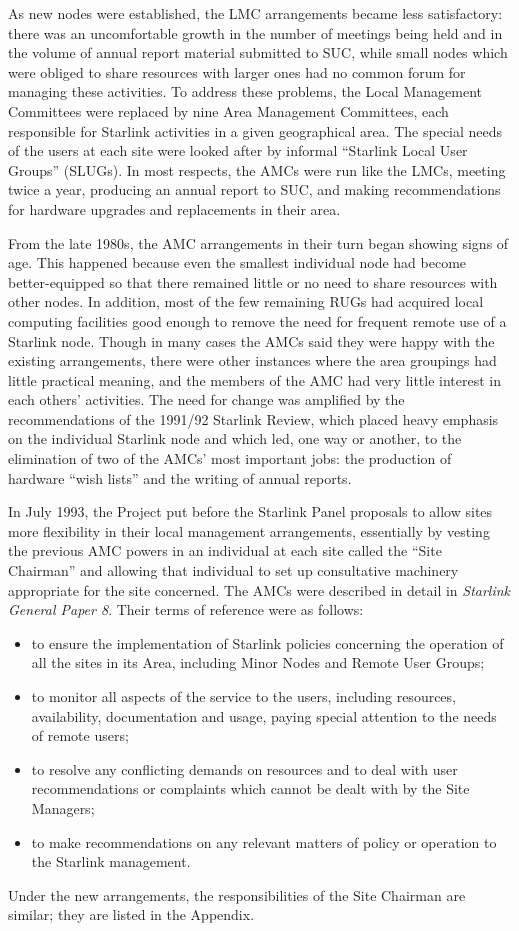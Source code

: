 As new nodes were established, the LMC arrangements became less
satisfactory:  there was an uncomfortable growth in the number of meetings
being held and in the volume of annual report material submitted to SUC,
while small nodes which were obliged to share resources with larger ones
had no common forum for managing these activities.  To address these
problems, the Local Management Committees were replaced by nine Area
Management Committees, each responsible for Starlink activities in a
given geographical area.  The special needs of the users at each site
were looked after by informal ``Starlink Local User Groups'' (SLUGs).  In
most respects, the AMCs were run like the LMCs, meeting twice a year,
producing an annual report to SUC, and making recommendations for
hardware upgrades and replacements in their area.

From the late 1980s, the AMC arrangements in their turn began showing signs
of age.  This happened because even the smallest individual node had
become better-equipped so that there remained little or no need to share
resources with other nodes.  In addition, most of the few remaining RUGs
had acquired local computing facilities good enough to remove the need for
frequent remote use of a
Starlink node.  Though in many cases the AMCs said they were
happy with the existing arrangements, there were other instances where the
area groupings had little practical meaning, and the members of the AMC
had very little interest in each others' activities.
The need for change was amplified by
the recommendations of the 1991/92 Starlink Review, which placed heavy emphasis
on the individual Starlink node and which led, one way or another, to the
elimination of two of the AMCs' most important jobs:  the production of
hardware ``wish lists'' and the writing of annual reports.

In July 1993, the Project put before the Starlink Panel proposals
to allow sites more flexibility in their local management arrangements,
essentially by vesting the previous AMC powers in an individual at each
site called the ``Site Chairman'' and allowing that individual to
set up consultative machinery appropriate for the site concerned.
The AMCs were described in detail in {\it Starlink General Paper 8}.
Their terms of reference were as follows:
\begin{itemize}
\item to ensure the implementation of Starlink policies concerning the
      operation of all the sites in its Area, including Minor Nodes and
      Remote User Groups;
\item to monitor all aspects of the service to the users, including
      resources, availability, documentation and usage, paying special
      attention to the needs of remote users;
\item to resolve any conflicting demands on resources and to deal with
      user recommendations or complaints which cannot be dealt with by the
      Site Managers;
\item to make recommendations on any relevant matters of policy or
      operation to the Starlink management.
\end{itemize}
Under the new arrangements, the responsibilities of the
Site Chairman are similar;  they are listed in the Appendix.

